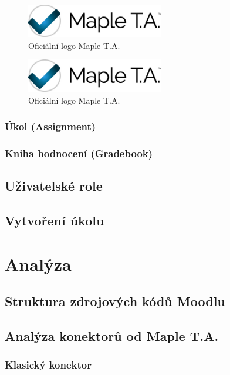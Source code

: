 \documentclass[
print,
  11pt,
  table,   
  nolof,    
  nolot,
  oneside,
  draft
]{fithesis3}
\begin{document}
		\begin{figure}
		  \begin{center}
		    \includegraphics[width=60mm]{images/MapleTA_logo.jpg}
		   \end{center}
		  \caption{Oficiální logo Maple T.A.  \cite{maple-logo}}
		  \label{fig:maplelogo}
		\end{figure}

		\begin{figure}
		  \begin{center}
		    \includegraphics[width=60mm]{images/MapleTA_logo.jpg}
		   \end{center}
		  \caption{Oficiální logo Maple T.A.  \cite{maple-logo}}
		  \label{fig:maplelogo}
		\end{figure}

		\subsection{Úkol (Assignment)}
		\subsection{Kniha hodnocení (Gradebook)}
	\section{Uživatelské role}
	\section{Vytvoření úkolu}
\chapter{Analýza}
	\section{Struktura zdrojových kódů Moodlu}
	\section{Analýza konektorů od Maple T.A.}
		\subsection{Klasický konektor}
\end{document}
